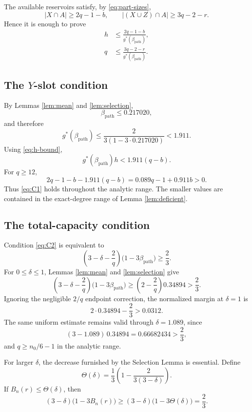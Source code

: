 \documentclass{article}
\theoremstyle{remark}
\begin{document}
The available reservoirs satisfy, by \eqref{eq:part-sizes},
\begin{equation}\label{eq:reservoir-sizes}
 |X\cap A|\geq2q-1-b,
 \qquad
 |(X\cup Z)\cap A|\geq3q-2-r.
\end{equation}
Hence it is enough to prove
\begin{align}
 h&\leq
 \frac{2q-1-b}{g^\ast(\beta_{\mathrm{path}})},
 \tag{C1}\label{eq:C1}\\
 q&\leq
 \frac{3q-2-r}{g^\ast(\beta_{\mathrm{path}})}.
 \tag{C2}\label{eq:C2}
\end{align}

\subsection{The \(Y\)-slot condition}

By Lemmas \ref{lem:mean} and \ref{lem:selection},
\[
 \beta_{\mathrm{path}}\leq0.217020,
\]
and therefore
\[
 g^\ast(\beta_{\mathrm{path}})
 \leq
 \frac{2}{3(1-3\cdot0.217020)}
 <1.911.
\]
Using \eqref{eq:h-bound},
\[
 g^\ast(\beta_{\mathrm{path}})h
 <1.911(q-b).
\]
For \(q\geq12\),
\[
 2q-1-b-1.911(q-b)
 =
 0.089q-1+0.911b>0.
\]
Thus \eqref{eq:C1} holds throughout the analytic range. The smaller
values are contained in the exact-degree range of Lemma
\ref{lem:deficient}.

\subsection{The total-capacity condition}

Condition \eqref{eq:C2} is equivalent to
\begin{equation}\label{eq:C2-normalized}
 \left(3-\delta-\frac2q\right)
 \bigl(1-3\beta_{\mathrm{path}}\bigr)
 \geq\frac23.
\end{equation}
For \(0\leq\delta\leq1\), Lemmas \ref{lem:mean} and
\ref{lem:selection} give
\[
 \left(3-\delta-\frac2q\right)
 \bigl(1-3\beta_{\mathrm{path}}\bigr)
 \geq
 \left(2-\frac2q\right)0.34894
 >
 \frac23.
\]
Ignoring the negligible \(2/q\) endpoint correction, the normalized
margin at \(\delta=1\) is
\[
 2\cdot0.34894-\frac23>0.0312.
\]
The same uniform estimate remains valid through
\(\delta=1.089\), since
\[
 (3-1.089)\,0.34894=0.66682434>\frac23,
\]
and \(q\geq n_0/6-1\) in the analytic range.

For larger \(\delta\), the decrease furnished by the Selection Lemma
is essential. Define
\begin{equation}\label{eq:Theta}
 \Theta(\delta)=
 \frac13\left(
  1-\frac{2}{3(3-\delta)}
 \right).
\end{equation}
If \(B_n(r)\leq\Theta(\delta)\), then
\[
 (3-\delta)\bigl(1-3B_n(r)\bigr)
 \geq
 (3-\delta)\bigl(1-3\Theta(\delta)\bigr)
 =
 \frac23.
\]
\end{document}
